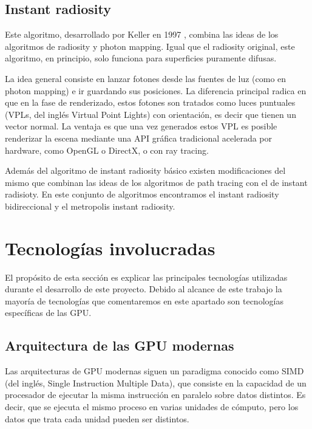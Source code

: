 \subsection{Instant radiosity}

Este algoritmo, desarrollado por Keller en 1997 \nocite{Keller1997}, combina las ideas de los algoritmos de radiosity y photon mapping. Igual que el radiosity original, este algoritmo, en principio, solo funciona para superficies puramente difusas.

\medskip
La idea general consiste en lanzar fotones desde las fuentes de luz (como en photon mapping) e ir guardando sus posiciones. La diferencia principal radica en que en la fase de renderizado, estos fotones son tratados como luces puntuales (VPLs, del inglés Virtual Point Lights) con orientación, es decir que tienen un vector normal. La ventaja es que una vez generados estos VPL es posible renderizar la escena mediante una API gráfica tradicional acelerada por hardware, como OpenGL o DirectX, o con ray tracing.

\medskip

Además del algoritmo de instant radiosity básico existen modificaciones del mismo que combinan las ideas de los algoritmos de path tracing con el de instant radisioty. En este conjunto de algoritmos encontramos el instant radiosity bidireccional y el metropolis instant radiosity.  


\clearpage

\section{Tecnologías involucradas}

El propósito de esta sección es explicar las principales tecnologías utilizadas durante el desarrollo de este proyecto. Debido al alcance de este trabajo la mayoría de tecnologías que comentaremos en este apartado son tecnologías específicas de las GPU.

\subsection{Arquitectura de las GPU modernas}

Las arquitecturas de GPU modernas siguen un paradigma conocido como SIMD (del inglés, Single Instruction Multiple Data), que consiste en la capacidad de un procesador de ejecutar la misma instrucción en paralelo sobre datos distintos. Es decir, que se ejecuta el mismo proceso en varias unidades de cómputo, pero los datos que trata cada unidad pueden ser distintos.

